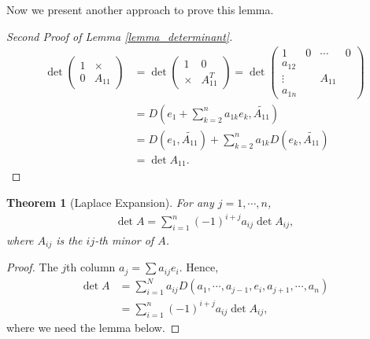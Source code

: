\documentclass[11pt]{book}
\newtheorem{theorem}{Theorem}[chapter]
\theoremstyle{definition}
\numberwithin{equation}{chapter}
\begin{document}
Now we present another approach to prove this lemma.
\begin{proof}[Second Proof of Lemma \ref{lemma_determinant}]
\begin{align*}
    \det \left(
    \begin{matrix}
        1 & \times\\
        0 & A_{11}
    \end{matrix}
    \right) & = \det \left(
    \begin{matrix}
        1 & 0\\
        \times & A_{11}^T
    \end{matrix}
    \right) = \det \left(
    \begin{matrix}
        1      & 0 & \cdots & 0\\
        a_{12} &  &\\
        \vdots &  & A_{11}\\
        a_{1n}
    \end{matrix}
    \right)\\
    & = D\left(e_1 + \sum^n_{k=2}a_{1k}e_k, \widetilde{A_{11}}\right) \\
    & = D(e_1, \widetilde{A_{11}}) + \sum^n_{k=2}a_{1k} D(e_k, \widetilde{A_{11}}) \\
    & = \det A_{11}.
\end{align*}
\end{proof}

\medskip

\begin{theorem}[Laplace Expansion]\label{Laplace_Expansion_Theorem}
For any $j = 1,\cdots,n$, 
\begin{align*}
    \det A = \sum^n_{i=1}(-1)^{i+j} a_{ij} \det A_{ij},
\end{align*}
where $A_{ij}$ is the $ij$-th minor of $A$.
\end{theorem}
\begin{proof}
The $j$th column $a_j = \sum a_{ij} e_i$. Hence,
\begin{align*}
    \det A & = \sum^N_{i=1} a_{ij} D(a_1,\cdots,a_{j-1},e_i, a_{j+1},\cdots,a_n) \\
    & = \sum^n_{i=1} (-1)^{i+j} a_{ij} \det A_{ij},
\end{align*}
where we need the lemma below.
\end{proof}

\medskip
\end{document}
